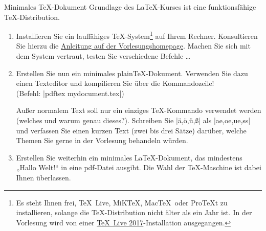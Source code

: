 \documentclass[
	vorläufig=false, 
	blattnr=0,
	ausgabe=2017-10-20,
	abgabe=2017-10-27,
	lösung=false,
	shortverb,
]{../tex/latexkurs-exercise}
\begin{document}
\begin{abstract}
	\noindent Achtung: Da die Installation der \TeX-Distribution grundlegend für den Kurs ist,
	muss die Abgabe für dieses Blatt von jedem einzeln bearbeitet werden. \\
	\emph{Keine Gruppenabgabe!}
\end{abstract}

\begin{aufgabe}[12]{Minimales \TeX-Dokument}
	Grundlage des \LaTeX-Kurses ist eine funktionsfähige \TeX-Distribution. 
	\begin{enumerate}[label=\alph*)]
		\item Installieren Sie ein lauffähiges \TeX-System\footnote{ Es steht Ihnen frei, \TeX~Live, MiK\TeX, Mac\TeX~oder Pro\TeX t zu installieren, solange die \TeX-Distribution nicht älter als ein Jahr ist. In der Vorlesung wird von einer \href{http://www.tug.org/texlive/}{\TeX~Live 2017}-Installation ausgegangen.} auf Ihrem Rechner. Konsultieren Sie hierzu die \href{http://latexkurs.github.io/exercises/00_texlive_installation.pdf}{Anleitung auf der Vorlesungshomepage}. Machen Sie sich mit dem System vertraut, testen Sie verschiedene Befehle …

		\item \label{aufg:texdoc} Erstellen Sie nun ein minimales plain\TeX-Dokument. Verwenden Sie dazu einen Texteditor und kompilieren Sie über die Kommandozeile! \\(Befehl: |pdftex mydocument.tex|)

		Außer normalem Text soll nur ein einziges \TeX-Kommando verwendet werden (welches und warum genau dieses?). Schreiben Sie |ä,ö,ü,ß| als |ae,oe,ue,ss| und verfassen Sie einen kurzen Text (zwei bis drei Sätze) darüber, welche Themen Sie gerne in der Vorlesung behandeln würden.

		\item \label{aufg:latexdoc} Erstellen Sie weiterhin ein minimales \LaTeX-Dokument, das mindestens „Hallo Welt!“ in eine pdf-Datei ausgibt. Die Wahl der \TeX-Maschine ist dabei Ihnen überlassen.
	\end{enumerate}
\end{aufgabe}


\end{document}
